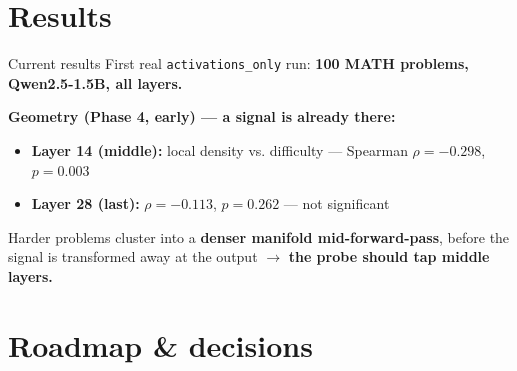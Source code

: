\documentclass[aspectratio=169,12pt,t,compress]{beamer}
\newcommand{\good}[1]{\cellcolor{HSEGreen!18}#1}
\begin{document}
\section{Results}

\begin{frame}{Current results}
	First real \texttt{activations\_only} run:
	\textbf{100 MATH problems, Qwen2.5-1.5B, all layers.}

	\vspace{0.5em}
	\textbf{Geometry (Phase 4, early) --- a signal is already there:}
	\begin{itemize}
		\item \textbf{Layer 14 (middle):} local density vs. difficulty ---
		      \good{Spearman $\rho = -0.298$, $p = 0.003$} \checkmark
		\item \textbf{Layer 28 (last):} $\rho = -0.113$, $p = 0.262$ --- not significant
	\end{itemize}

	\vspace{0.5em}
	\begin{exampleblock}{}
		\footnotesize
		Harder problems cluster into a \textbf{denser manifold
		mid-forward-pass}, before the signal is transformed away at the output
		$\to$ \textbf{the probe should tap middle layers.}
	\end{exampleblock}
\end{frame}

\section{Roadmap \& decisions}
\end{document}
